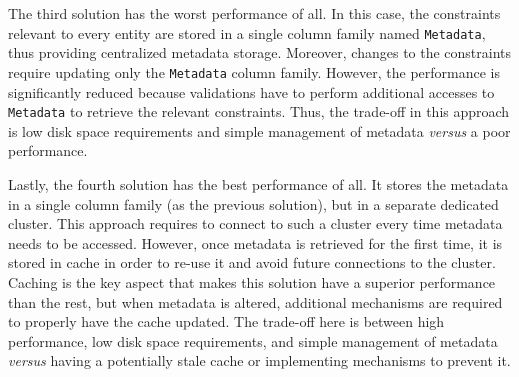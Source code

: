 

The third solution has the worst performance of all. In this case, the
constraints relevant to every entity are  stored in a single column family
named \texttt{Metadata}, thus providing centralized metadata storage. Moreover, 
changes to the constraints require updating only the \texttt{Metadata} column
family. However, the performance is significantly reduced
because validations have to perform additional accesses to \texttt{Metadata} to
retrieve the relevant constraints. Thus, the trade-off in this
approach is low disk space requirements and simple management of metadata
\textit{versus} a  poor performance.

Lastly, the fourth solution has the best performance of all. It stores  
the metadata in a single column family (as the previous solution), but in  a
separate dedicated cluster. This approach requires to connect to such a cluster
every time metadata needs to be accessed. However, once metadata is
retrieved for the first time, it is stored in cache in order to re-use it
and avoid future connections to the cluster. Caching is the key aspect that
makes this solution have a superior performance than the rest, but when
 metadata is altered, additional mechanisms are required  to properly
 have the cache updated. The trade-off here is between high performance,  low
 disk space requirements, and simple management of metadata \textit{versus} having a
 potentially stale cache or implementing mechanisms to prevent it.




